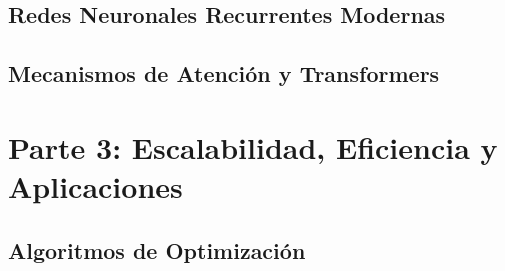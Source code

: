 \documentclass[
]{book}
\begin{document}
\hypertarget{redes-neuronales-recurrentes-modernas}{%
\chapter{Redes Neuronales Recurrentes Modernas}\label{redes-neuronales-recurrentes-modernas}}

\hypertarget{mecanismos-de-atenciuxf3n-y-transformers}{%
\chapter{Mecanismos de Atención y Transformers}\label{mecanismos-de-atenciuxf3n-y-transformers}}

\hypertarget{part-parte-3-escalabilidad-eficiencia-y-aplicaciones}{%
\part*{Parte 3: Escalabilidad, Eficiencia y Aplicaciones}\label{part-parte-3-escalabilidad-eficiencia-y-aplicaciones}}

\hypertarget{algoritmos-de-optimizaciuxf3n}{%
\chapter{Algoritmos de Optimización}\label{algoritmos-de-optimizaciuxf3n}}

  
\end{document}
